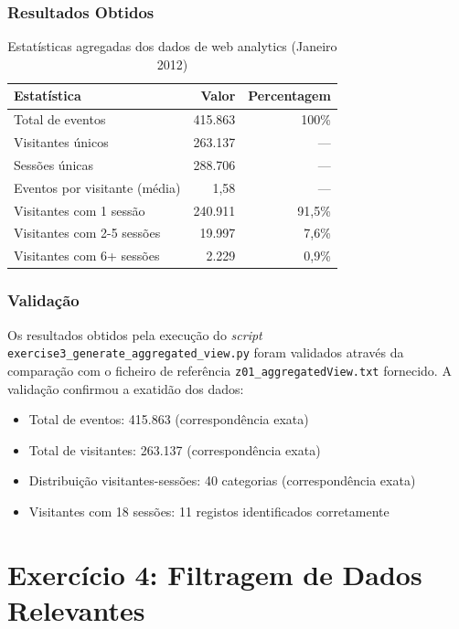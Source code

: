 \documentclass[11pt,a4paper]{article}
\begin{document}
\subsubsection{Resultados Obtidos}

\begin{table}[H]
\centering
\begin{tabular}{@{}lrr@{}}
\toprule
\textbf{Estatística} & \textbf{Valor} & \textbf{Percentagem} \\ \midrule
Total de eventos & 415.863 & 100\% \\
Visitantes únicos & 263.137 & --- \\
Sessões únicas & 288.706 & --- \\
Eventos por visitante (média) & 1,58 & --- \\
Visitantes com 1 sessão & 240.911 & 91,5\% \\
Visitantes com 2-5 sessões & 19.997 & 7,6\% \\
Visitantes com 6+ sessões & 2.229 & 0,9\% \\ \bottomrule
\end{tabular}
\caption{Estatísticas agregadas dos dados de web analytics (Janeiro 2012)}
\label{tab:stats_ex3}
\end{table}

\newpage

\subsubsection{Validação}

Os resultados obtidos pela execução do \textit{script} \texttt{exercise3\_generate\_aggregated\_view.py} foram validados através da comparação com o ficheiro de referência \texttt{z01\_aggregatedView.txt} fornecido. A validação confirmou a exatidão dos dados:

\begin{itemize}
    \item Total de eventos: 415.863 (correspondência exata)
    \item Total de visitantes: 263.137 (correspondência exata)
    \item Distribuição visitantes-sessões: 40 categorias (correspondência exata)
    \item Visitantes com 18 sessões: 11 registos identificados corretamente
\end{itemize}

\newpage

\section{Exercício 4: Filtragem de Dados Relevantes}
\end{document}
